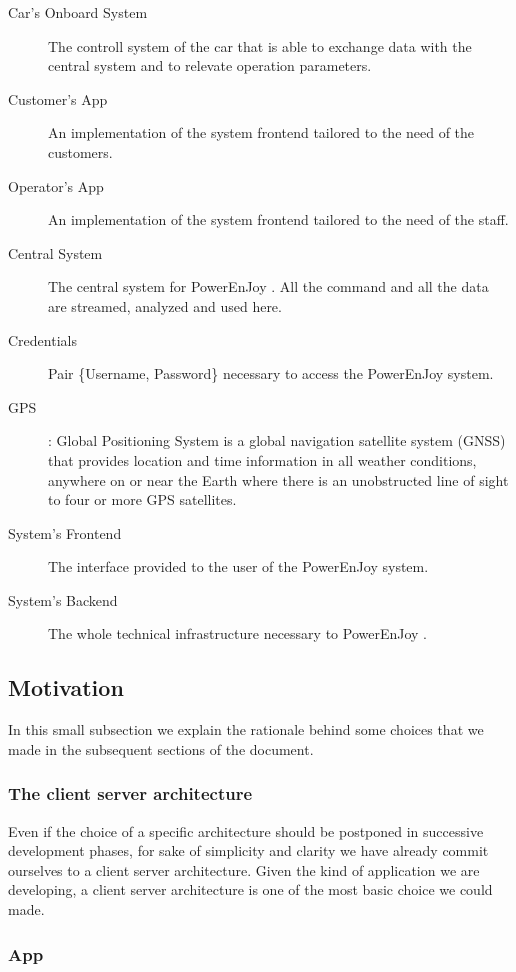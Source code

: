 \documentclass[11pt]{article} %
\newcommand{\pe}{PowerEnJoy }
\begin{document}
\begin{description}
	\item[Car's Onboard System] The controll system of the car that is able to exchange data with the central system and to relevate operation parameters.
	\item[Customer's App] An implementation of the system frontend tailored to the need of the customers.
	\item[Operator's App] An implementation of the system frontend tailored to the need of the staff.
	\item[Central System] The central system for \pe. All the command and all the data are streamed, analyzed and used here.
	\item[Credentials] Pair \{Username, Password\} necessary to access the \pe system.
  	\item[GPS]: Global Positioning System is a global navigation satellite system (GNSS) that provides location and time information in all weather conditions, anywhere on or near the Earth where there is an unobstructed line of sight to four or more GPS satellites.
  	\item[System's Frontend] The interface provided to the user of the \pe system. 
  	\item[System's Backend]  The whole technical infrastructure necessary to \pe.
  \end{description}

\subsection{Motivation}

In this small subsection we explain the rationale behind some choices that we made in the subsequent sections of the document.

\subsubsection{The client server architecture}

Even if the choice of a specific architecture should be postponed in successive development phases, for sake of simplicity and clarity we have already commit ourselves to a client server architecture. Given the kind of application we are developing, a client server architecture is one of the most basic choice we could made.

\subsubsection{App}
\end{document}
